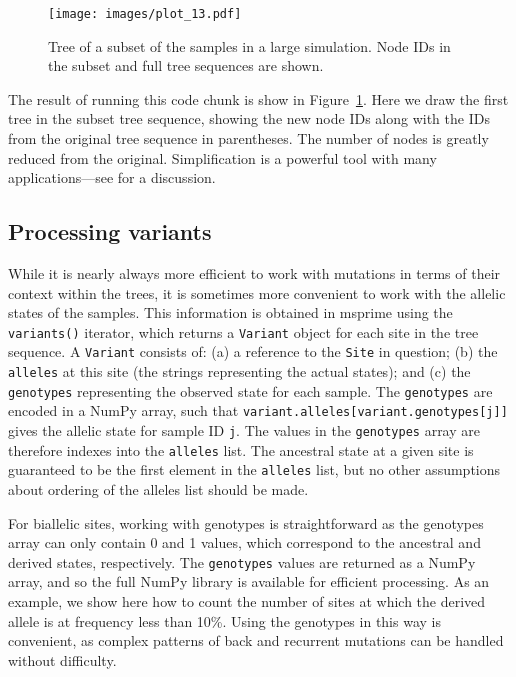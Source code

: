 \documentclass[graybox]{svmult}
\begin{document}
\begin{figure}[t]
\centering
\texttt{[image: images/plot\_13.pdf]}
\caption{\label{fig-tree-subset} Tree of a subset of the samples in a large
simulation. Node IDs in the subset and full tree sequences are shown.}
\end{figure}

The result of running this code chunk is show in Figure~\ref{fig-tree-subset}.
Here we draw the first tree in the subset tree sequence, showing the new
node IDs along with the IDs from the original tree sequence in
parentheses. The number of nodes is greatly reduced from the original.
Simplification is a powerful tool with many applications---see
\cite{wong2024general} for a discussion.

\subsection{Processing variants}\label{processing-variants}

While it is nearly always more efficient to work with mutations in terms
of their context within the trees, it is sometimes more convenient to
work with the allelic states of the samples. This information is
obtained in msprime using the \texttt{variants()} iterator, which
returns a \texttt{Variant} object for each site in the tree sequence. A
\texttt{Variant} consists of: (a) a reference to the \texttt{Site} in question;
(b) the \texttt{alleles} at this site (the strings representing the
actual states); and (c) the \texttt{genotypes} representing the observed
state for each sample. The \texttt{genotypes} are encoded in a NumPy
array, such that \texttt{variant.alleles{[}variant.genotypes{[}j{]}{]}}
gives the allelic state for sample ID \texttt{j}. The values in the
\texttt{genotypes} array are therefore indexes into the \texttt{alleles}
list. The ancestral state at a given site is guaranteed to be the first
element in the \texttt{alleles} list, but no other assumptions about
ordering of the alleles list should be made.

For biallelic sites, working with genotypes is straightforward as the
genotypes array can only contain 0 and 1 values, which correspond to
the ancestral and derived states, respectively. The \texttt{genotypes}
values are returned as a NumPy array, and so the full NumPy library is
available for efficient processing. As an example, we show here how to
count the number of sites at which the derived allele is at frequency
less than 10\%. Using the genotypes in this way is convenient, as
complex patterns of back and recurrent mutations can be handled without
difficulty.
\end{document}

